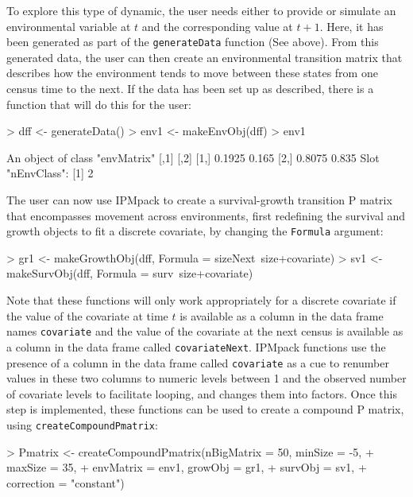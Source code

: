 \documentclass{article}
\begin{document}
To explore this type of dynamic, the user needs  either to provide or simulate
an environmental variable at $t$ and the corresponding value at $t+1$. Here, it
has been generated as part of the {\tt generateData} function (See above). From
this generated data, the user can then create an environmental transition matrix
that describes how the environment tends to move between these states from one
census time to the next. If the data has been set up as described, there is a function that will do this for the user:
\begin{Schunk}
\begin{Sinput}
> dff <- generateData()
> env1 <- makeEnvObj(dff) 
> env1
\end{Sinput}
\begin{Soutput}
An object of class "envMatrix"
       [,1]  [,2]
[1,] 0.1925 0.165
[2,] 0.8075 0.835
Slot "nEnvClass":
[1] 2
\end{Soutput}
\end{Schunk}
The user can now use IPMpack to create a survival-growth transition P matrix that encompasses movement across environments, first redefining the survival and growth
objects to fit a discrete covariate, by changing the {\tt Formula} argument: 
\begin{Schunk}
\begin{Sinput}
> gr1 <- makeGrowthObj(dff, Formula = sizeNext~size+covariate)
> sv1 <- makeSurvObj(dff, Formula = surv~size+covariate)
\end{Sinput}
\end{Schunk}
Note that these functions will only work appropriately for a discrete
covariate if the value of the covariate at time $t$ is available as a
column in the data frame names {\tt covariate} and the value of the
covariate at the next census is available as a column in the data
frame called {\tt covariateNext}. IPMpack functions use the presence
of a column in the data frame called {\tt covariate} as a cue to
renumber values in these two columns to numeric levels between 1 and
the observed number of covariate levels to facilitate looping, and
changes them into factors. Once this step is implemented, these
functions can be used to create a compound P matrix, using {\tt createCompoundPmatrix}: 
\begin{Schunk}
\begin{Sinput}
> Pmatrix <- createCompoundPmatrix(nBigMatrix = 50, minSize = -5, 
+                                  maxSize = 35, 
+                                  envMatrix = env1, growObj = gr1, 
+                                  survObj = sv1, 
+                                  correction = "constant")
\end{Sinput}
\end{Schunk}
\end{document}
